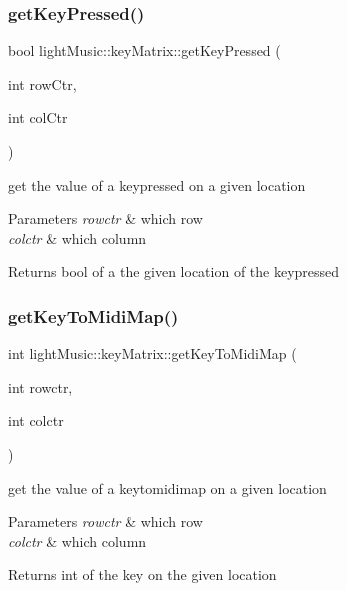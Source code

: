 \subsubsection{\texorpdfstring{get\+Key\+Pressed()}{getKeyPressed()}}
{\footnotesize\ttfamily bool light\+Music\+::key\+Matrix\+::get\+Key\+Pressed (\begin{DoxyParamCaption}\item[{int}]{row\+Ctr,  }\item[{int}]{col\+Ctr }\end{DoxyParamCaption})}



get the value of a keypressed on a given location 


\begin{DoxyParams}{Parameters}
{\em rowctr} & which row \\
\hline
{\em colctr} & which column \\
\hline
\end{DoxyParams}
\begin{DoxyReturn}{Returns}
bool of a the given location of the keypressed 
\end{DoxyReturn}
\mbox{\label{classlight_music_1_1key_matrix_a0da0736764140f22eeb6874f4b5d2080}} 
\subsubsection{\texorpdfstring{get\+Key\+To\+Midi\+Map()}{getKeyToMidiMap()}}
{\footnotesize\ttfamily int light\+Music\+::key\+Matrix\+::get\+Key\+To\+Midi\+Map (\begin{DoxyParamCaption}\item[{int}]{rowctr,  }\item[{int}]{colctr }\end{DoxyParamCaption})}



get the value of a keytomidimap on a given location 


\begin{DoxyParams}{Parameters}
{\em rowctr} & which row \\
\hline
{\em colctr} & which column \\
\hline
\end{DoxyParams}
\begin{DoxyReturn}{Returns}
int of the key on the given location 
\end{DoxyReturn}
\mbox{\label{classlight_music_1_1key_matrix_a3e25f2258ac3be18fe6e85f6cf0cccfa}} 
